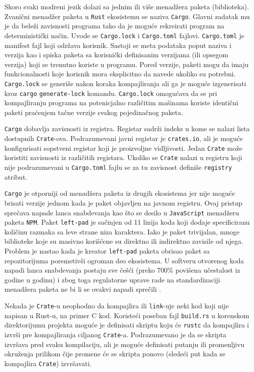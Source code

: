 Skoro svaki modreni jezik dolazi sa jednim ili više menadžera paketa (biblioteka). Zvanični menadžer paketa u \verb|Rust|
ekosistemu se naziva \verb|Cargo|. Glavni zadatak mu je da beleži zavisnosti programa tako da je moguće rekreirati 
program na deterministički način. Uvode se \verb|Cargo.lock| i \verb|Cargo.toml|
fajlovi. \verb|Cargo.toml| je manifest fajl koji održava korisnik. Sastoji se meta podataka poput naziva i verzija kao i spiska paketa sa korisnički definisanim 
verzijama (ili opsegom verzija) koji se trenutno koriste u programu. Pored verzije, paketi mogu da imaju funkcionalnosti koje korisnik mora eksplicitno da navede ukoliko su potrebni.
\verb|Cargo.lock| se generiše nakon koraka kompajliranja ali ga je moguće izgenerisati kroz \verb|cargo| \verb|generate-lock| komandu.
\verb|Cargo.lock| omogućava da se pri kompajliranju programa na potenicjalno različitim mašinama koriste identični paketi praćenjem tačne verzije svakog pojedinačnog paketa.

\verb|Cargo| dobavlja zavisnosti iz registra. Registar sadrži indeks u kome se nalazi lista dostupnih \verb|Crate|-ova. Podrazumevani javni registar je \verb|crates.io|, ali je moguće 
konfigurisati sopstveni registar koji je proizvoljne vidljivosti. Jedan \verb|Crate| može koristiti zavisnosti iz različitih registara. Ukoliko se \verb|Crate| nalazi u registru koji nije 
podrazumevani u \verb|Cargo.toml| fajlu se za tu zavisnost definiše \verb|registry| atribut.

\verb|Cargo| je otporniji od menadžera paketa iz drugih ekosistema jer nije moguće brisati verzije jednom kada je paket objavljen na javnom registru. 
Ovaj pristup sprečava napade lanca snabdevanja kao što se desilo u \verb|JavaScript| menadžeru paketa \verb|NPM|. Paket \verb|left-pad| 
je sačinjen od 11 linija koda koji dodaje specificiranu količinu razmaka sa leve strane niza karaktera. Iako je paket trivijalan, mnoge biblioteke koje 
su masivno korišćene su direktno ili indirektno zavisile od njega. Problem je nastao kada je kreator \verb|left-pad| paketa obrisao 
paket sa repozitorijuma poremetivši ogroman deo ekosistema. U softveru otvorenog koda napadi lanca snabdevanja postaju sve češći (preko 700\% povišena učestalost
iz godine u godinu) i zbog toga regulatorne uprave rade na standardizaciji menadžera paketa ne bi li se ovakvi napadi sprečili \cite{supply-chain}.

Nekada je \verb|Crate|-u neophodno da kompajlira ili \verb|link|-uje neki kod koji nije napisan u Rust-u, na primer C kod. Koristeći poseban fajl \verb|build.rs| u korenskom direktorijumu 
projekta moguće je definisati skriptu koju će \verb|rustc| da kompajlira i izvrši pre kompajliranja ciljanog \verb|Crate|-a. Podrazumevano je da se skripta izvršava pred svaku kompilaciju,
ali je moguće definisati putanju ili promenljivu okruženja prilikom čije promene će se skripta ponovo (sledeći put kada se kompajlira \verb|Crate|) izvršavati.


